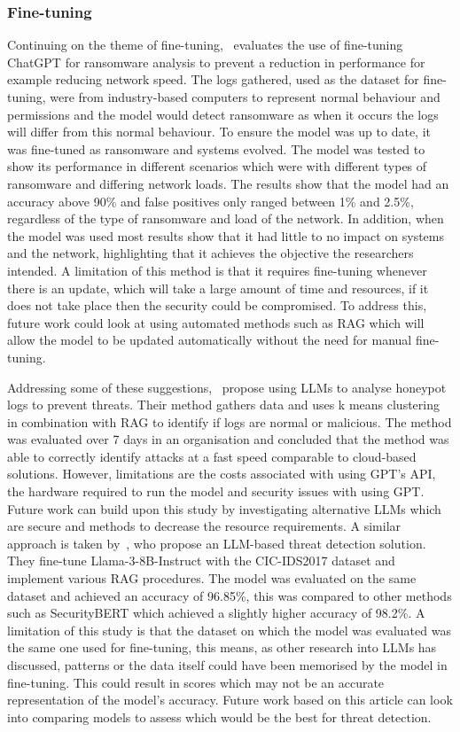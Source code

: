 \subsubsection{Fine-tuning}
Continuing on the theme of fine-tuning,~\cite{novaklightweight} evaluates the use of fine-tuning ChatGPT for ransomware analysis to prevent a reduction in performance for example reducing network speed. The logs gathered, used as the dataset for fine-tuning, were from industry-based computers to represent normal behaviour and permissions and the model would detect ransomware as when it occurs the logs will differ from this normal behaviour. To ensure the model was up to date, it was fine-tuned as ransomware and systems evolved. The model was tested to show its performance in different scenarios which were with different types of ransomware and differing network loads. The results show that the model had an accuracy above 90\% and false positives only ranged between 1\% and 2.5\%, regardless of the type of ransomware and load of the network. In addition, when the model was used most results show that it had little to no impact on systems and the network, highlighting that it achieves the objective the researchers intended. A limitation of this method is that it requires fine-tuning whenever there is an update, which will take a large amount of time and resources, if it does not take place then the security could be compromised. To address this, future work could look at using automated methods such as RAG which will allow the model to be updated automatically without the need for manual fine-tuning. 

Addressing some of these suggestions,~\cite{lanka2024intelligent} propose using LLMs to analyse honeypot logs to prevent threats. Their method gathers data and uses k means clustering in combination with RAG to identify if logs are normal or malicious. The method was evaluated over 7 days in an organisation and concluded that the method was able to correctly identify attacks at a fast speed comparable to cloud-based solutions. However, limitations are the costs associated with using GPT's API, the hardware required to run the model and security issues with using GPT. Future work can build upon this study by investigating alternative LLMs which are secure and methods to decrease the resource requirements. A similar approach is taken by~\cite{rahmani2024integrating}, who propose an LLM-based threat detection solution. They fine-tune Llama-3-8B-Instruct with the CIC-IDS2017 dataset and implement various RAG procedures. The model was evaluated on the same dataset and achieved an accuracy of 96.85\%, this was compared to other methods such as SecurityBERT which achieved a slightly higher accuracy of 98.2\%. A limitation of this study is that the dataset on which the model was evaluated was the same one used for fine-tuning, this means, as other research into LLMs has discussed, patterns or the data itself could have been memorised by the model in fine-tuning. This could result in scores which may not be an accurate representation of the model's accuracy. Future work based on this article can look into comparing models to assess which would be the best for threat detection.


